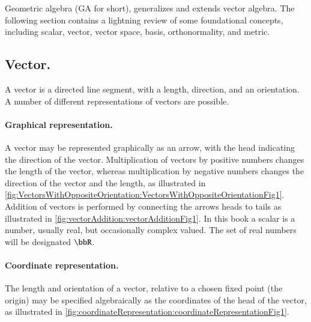 %
%
Geometric algebra (GA for short), generalizes and extends vector algebra.
The following section contains a lightning review of some
foundational concepts, including
scalar, vector, vector space, basis, orthonormality, and metric.

\subsection{Vector.}
A vector is a directed line segment, with a length, direction, and an orientation.  A number of different representations of vectors are possible.

\paragraph{Graphical representation.}
A vector may be represented graphically as an arrow, with the head indicating the direction of the vector.
Multiplication of vectors by positive numbers changes the length of the vector, whereas multiplication by negative numbers changes the direction of the vector and the length, as illustrated in
\cref{fig:VectorsWithOppositeOrientation:VectorsWithOppositeOrientationFig1}.
Addition of vectors is performed by connecting the arrows heads to tails as illustrated in
\cref{fig:vectorAddition:vectorAdditionFig1}.
\index{\(\bbR\)}
In this book a scalar is a number, usually real, but occasionally complex valued.  The set of real numbers will be designated \(\bbR\).

\paragraph{Coordinate representation.}
The length and orientation of a vector, relative to a chosen fixed point (the origin) may be specified algebraically as the coordinates of the head of the vector, as
illustrated in \cref{fig:coordinateRepresentation:coordinateRepresentationFig1}.

